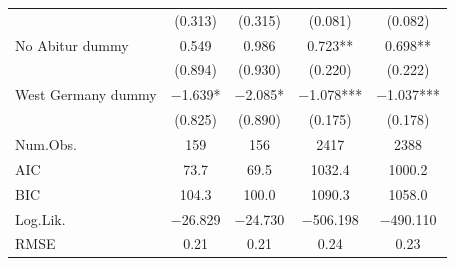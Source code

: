 \documentclass[
]{article}
\begin{document}
\begin{table}[!h]
\begin{tabular}[t]{lcccc}
 & (\num{0.313}) & (\num{0.315}) & (\num{0.081}) & (\num{0.082})\\
No Abitur dummy & \num{0.549} & \num{0.986} & \num{0.723}** & \num{0.698}**\\
 & (\num{0.894}) & (\num{0.930}) & (\num{0.220}) & (\num{0.222})\\
West Germany dummy & \num{-1.639}* & \num{-2.085}* & \num{-1.078}*** & \num{-1.037}***\\
 & (\num{0.825}) & (\num{0.890}) & (\num{0.175}) & (\num{0.178})\\
\midrule
Num.Obs. & \num{159} & \num{156} & \num{2417} & \num{2388}\\
AIC & \num{73.7} & \num{69.5} & \num{1032.4} & \num{1000.2}\\
BIC & \num{104.3} & \num{100.0} & \num{1090.3} & \num{1058.0}\\
Log.Lik. & \num{-26.829} & \num{-24.730} & \num{-506.198} & \num{-490.110}\\
RMSE & \num{0.21} & \num{0.21} & \num{0.24} & \num{0.23}\\
\bottomrule
\end{tabular}
\end{table}
\end{document}
